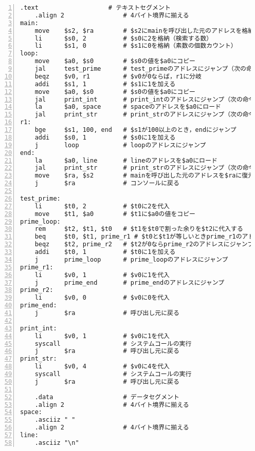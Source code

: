 \begin{Verbatim}[numbers=left, xleftmargin=10mm, numbersep=6pt,
                    fontsize=\small, baselinestretch=0.8]
    .text                   # テキストセグメント
    .align 2                # 4バイト境界に揃える
main:
    move    $s2, $ra        # $s2にmainを呼び出した元のアドレスを格納
    li      $s0, 2          # $s0に2を格納（検索する数）
    li      $s1, 0          # $s1に0を格納（素数の個数カウント）
loop:
    move    $a0, $s0        # $s0の値を$a0にコピー
    jal     test_prime      # test_primeのアドレスにジャンプ（次の命令のアドレスを$raに）
    beqz    $v0, r1         # $v0が0ならば，r1に分岐
    addi    $s1, 1          # $s1に1を加える
    move    $a0, $s0        # $s0の値を$a0にコピー
    jal     print_int       # print_intのアドレスにジャンプ（次の命令のアドレスを$raに）
    la      $a0, space      # spaceのアドレスを$a0にロード
    jal     print_str       # print_strのアドレスにジャンプ（次の命令のアドレスを$raに）
r1:
    bge     $s1, 100, end   # $s1が100以上のとき，endにジャンプ
    addi    $s0, 1          # $s0に1を加える
    j       loop            # loopのアドレスにジャンプ
end:
    la      $a0, line       # lineのアドレスを$a0にロード
    jal     print_str       # print_strのアドレスにジャンプ（次の命令のアドレスを$raに）
    move    $ra, $s2        # mainを呼び出した元のアドレスを$raに復元
    j       $ra             # コンソールに戻る

test_prime:
    li      $t0, 2          # $t0に2を代入
    move    $t1, $a0        # $t1に$a0の値をコピー
prime_loop:
    rem     $t2, $t1, $t0   # $t1を$t0で割った余りを$t2に代入する
    beq     $t0, $t1, prime_r1 # $t0と$t1が等しいときprime_r1のアドレスにジャンプ
    beqz    $t2, prime_r2   # $t2が0ならprime_r2のアドレスにジャンプ
    addi    $t0, 1          # $t0に1を加える
    j       prime_loop      # prime_loopのアドレスにジャンプ
prime_r1:
    li      $v0, 1          # $v0に1を代入
    j       prime_end       # prime_endのアドレスにジャンプ
prime_r2:
    li      $v0, 0          # $v0に0を代入
prime_end:
    j       $ra             # 呼び出し元に戻る

print_int:
    li      $v0, 1          # $v0に1を代入
    syscall                 # システムコールの実行
    j       $ra             # 呼び出し元に戻る
print_str:
    li      $v0, 4          # $v0に4を代入
    syscall                 # システムコールの実行
    j       $ra             # 呼び出し元に戻る

    .data                   # データセグメント
    .align 2                # 4バイト境界に揃える
space:
    .asciiz " "
    .align 2                # 4バイト境界に揃える
line:
    .asciiz "\n"
\end{Verbatim}


